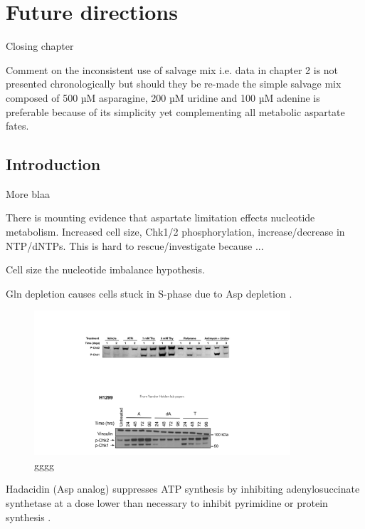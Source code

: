 \chapter{Future directions}
\label{chap6}


Closing chapter 

Comment on the inconsistent use of salvage mix i.e. data in chapter 2 is not presented chronologically but should they be re-made the simple salvage mix composed of 500 µM asparagine, 200 µM uridine and 100 µM adenine is preferable because of its simplicity yet complementing all metabolic aspartate fates.




\section{Introduction}
More blaa


There is mounting evidence that aspartate limitation effects nucleotide metabolism.
Increased cell size, Chk1/2 phosphorylation, increase/decrease in NTP/dNTPs.
This is hard to rescue/investigate because ...

Cell size the nucleotide imbalance hypothesis.

Gln depletion causes cells stuck in S-phase due to Asp depletion \cite{Patel2016-ms}.




\begin{figure}
    \centering
    \includegraphics[width=0.85\textwidth]{figures/chap6/P_Chk_wstrn.pdf}
    \caption[gggg.]{
    gggg
    }
    \label{fig:ch6:P_Chk_wstrn}
\end{figure}



Hadacidin (Asp analog) suppresses ATP synthesis by inhibiting adenylosuccinate synthetase at a dose lower than necessary to inhibit pyrimidine or protein synthesis \cite{Shigeura1962-nu, Shigeura1962-ot}.

